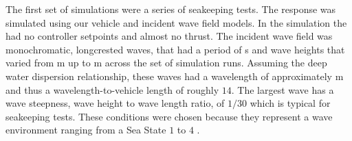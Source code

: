\documentclass[utf8]{frontiersSCNS} %
\begin{document}
The first set of simulations were a series of seakeeping tests. The \wamv{} response was simulated using our vehicle and incident wave field models. In the simulation the \wamv{} had no controller setpoints and almost no thrust. The incident wave field was monochromatic, longcrested waves, that had a period of \unit[6]{s} and wave heights that varied from \unit[0]{m} up to \unit[2]{m} across the set of simulation runs. Assuming the deep water dispersion relationship, these waves had a wavelength of approximately \unit[56]{m} and thus a wavelength-to-vehicle length of roughly $14$. The largest wave has a wave steepness, wave height to wave length ratio, of $1/30$ which is typical for seakeeping tests. These conditions were chosen because they represent a wave environment ranging from a Sea State $1$ to $4$ \citep{bales83designing}.
\end{document}
